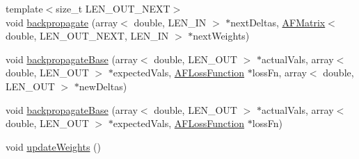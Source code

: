 \begin{DoxyCompactItemize}
{\footnotesize template$<$size\+\_\+t L\+E\+N\+\_\+\+O\+U\+T\+\_\+\+N\+E\+XT$>$ }\\void \hyperlink{class_layer_ac31f77202649fa3cefbeb1242075adf7}{backpropagate} (array$<$ double, L\+E\+N\+\_\+\+IN $>$ $\ast$next\+Deltas, \hyperlink{class_a_f_matrix}{A\+F\+Matrix}$<$ double, L\+E\+N\+\_\+\+O\+U\+T\+\_\+\+N\+E\+XT, L\+E\+N\+\_\+\+IN $>$ $\ast$next\+Weights)
\item 
void \hyperlink{class_layer_ac2b3a1c895cc243730809fc3fc68868b}{backpropagate\+Base} (array$<$ double, L\+E\+N\+\_\+\+O\+UT $>$ $\ast$actual\+Vals, array$<$ double, L\+E\+N\+\_\+\+O\+UT $>$ $\ast$expected\+Vals, \hyperlink{class_a_f_loss_function}{A\+F\+Loss\+Function} $\ast$loss\+Fn, array$<$ double, L\+E\+N\+\_\+\+O\+UT $>$ $\ast$new\+Deltas)
\item 
void \hyperlink{class_layer_a24abcd1a8327a079ec32a663b228b399}{backpropagate\+Base} (array$<$ double, L\+E\+N\+\_\+\+O\+UT $>$ $\ast$actual\+Vals, array$<$ double, L\+E\+N\+\_\+\+O\+UT $>$ $\ast$expected\+Vals, \hyperlink{class_a_f_loss_function}{A\+F\+Loss\+Function} $\ast$loss\+Fn)
\item 
void \hyperlink{class_layer_aa490ca327cae4e71d017d444c2c87468}{update\+Weights} ()
\end{DoxyCompactItemize}
